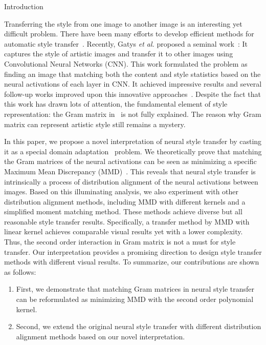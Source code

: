 \documentclass{article}
\begin{document}
\begin{section}{Introduction}

Transferring the style from one image to another image is an interesting yet difficult problem. There have been many efforts to develop efficient methods for automatic style transfer~\cite{hertzmann2001image,efros2001image,efros1999texture,shih2014style,kwatra2005texture}. Recently, Gatys \emph{et al.} proposed a seminal work~\cite{neuralart}: It captures the style of artistic images and transfer it to other images using Convolutional Neural Networks (CNN). This work formulated the problem as finding an image that matching both the content and style statistics based on the neural activations of each layer in CNN. It achieved impressive results and several follow-up works improved upon this innovative approaches~\cite{johnson2016perceptual,ulyanov2016texture,ruder2016artistic,ledig2016photo}. Despite the fact that this work has drawn lots of attention, the fundamental element of style representation: the Gram matrix in~\cite{neuralart} is not fully explained. The reason why Gram matrix can represent artistic style still remains a mystery.

In this paper, we propose a novel interpretation of neural style transfer by casting it as a special domain adaptation~\cite{beijbom2012domain,patel2015visual} problem. We theoretically prove that matching the Gram matrices of the neural activations can be seen as minimizing a specific Maximum Mean Discrepancy (MMD)~\cite{mmd}. This reveals that neural style transfer is intrinsically a process of distribution alignment of the neural activations between images. Based on this illuminating analysis, we also experiment with other distribution alignment methods, including MMD with different kernels and a simplified moment matching method. These methods achieve diverse but all reasonable style transfer results. Specifically, a transfer method by MMD with linear kernel achieves comparable visual results yet with a lower complexity. Thus, the second order interaction in Gram matrix is not a must for style transfer. Our interpretation provides a promising direction to design style transfer methods with different visual results. To summarize, our contributions are shown as follows:
\begin{enumerate}
\item First, we demonstrate that matching Gram matrices in neural style transfer~\cite{neuralart} can be reformulated as minimizing  MMD with the second order polynomial kernel.
\item Second, we extend the original neural style transfer with different distribution alignment methods based on our novel interpretation.
\end{enumerate}

\end{section}
\end{document}

